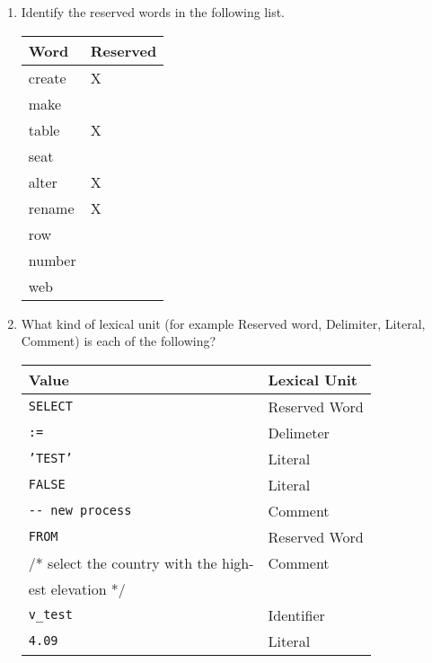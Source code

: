 \documentclass[11pt]{article}
\begin{document}
\begin{enumerate}
\item Identify the reserved words in the following list.
\begin{center}
\begin{tabular}{ll}
Word & Reserved\\[0pt]
\hline
create & X\\[0pt]
make & \\[0pt]
table & X\\[0pt]
seat & \\[0pt]
alter & X\\[0pt]
rename & X\\[0pt]
row & \\[0pt]
number & \\[0pt]
web & \\[0pt]
\end{tabular}
\end{center}
\item What kind of lexical unit (for example Reserved word, Delimiter, Literal,
Comment) is each of the following?
\begin{center}
\begin{tabular}{ll}
Value & Lexical Unit\\[0pt]
\hline
\texttt{SELECT} & Reserved Word\\[0pt]
\texttt{:=} & Delimeter\\[0pt]
\texttt{'TEST'} & Literal\\[0pt]
\texttt{FALSE} & Literal\\[0pt]
\texttt{-{}-{} new process} & Comment\\[0pt]
\texttt{FROM} & Reserved Word\\[0pt]
/* select the country with the high- & Comment\\[0pt]
est elevation */ & \\[0pt]
\texttt{v\_test} & Identifier\\[0pt]
\texttt{4.09} & Literal\\[0pt]
\end{tabular}
\end{center}
\end{enumerate}
\end{document}
